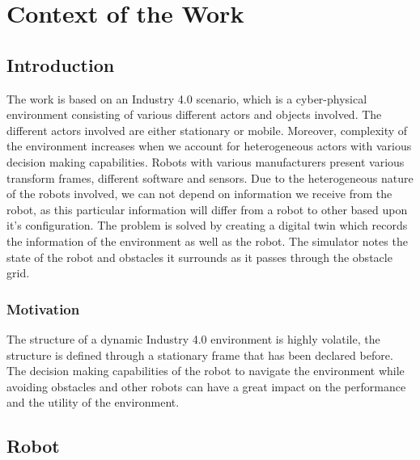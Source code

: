 \chapter{Context of the Work}

\label{ChapterX}

\section{Introduction}
The work is based on an Industry 4.0 scenario, which is a cyber-physical environment consisting of various different 
actors and objects involved. The different actors involved are either stationary or mobile. Moreover, complexity of the 
environment increases when we account for heterogeneous actors with various decision making capabilities. Robots with various
manufacturers present various transform frames, different software and sensors. Due to the heterogeneous nature of the robots 
involved, we can not depend on information we receive from the robot, as this particular information will differ from a robot 
to other based upon it's configuration. The problem is solved by creating a digital twin which records the information of the 
environment as well as the robot. The simulator notes the state of the robot and obstacles it surrounds as it passes 
through the obstacle grid. 

\subsection{Motivation}
The structure of a dynamic Industry 4.0 environment is highly volatile, the structure is defined through a stationary frame that 
has been declared before. The decision making capabilities of the robot to navigate the environment while avoiding obstacles and 
other robots can have a great impact on the performance and the utility of the environment. 
\section{Robot}
